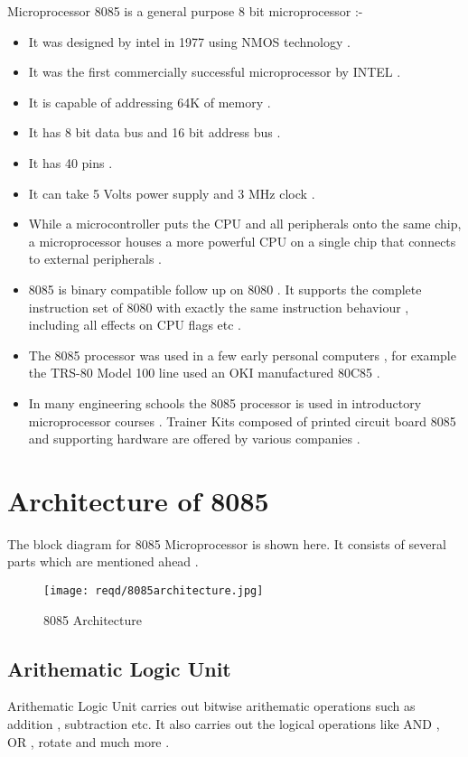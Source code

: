 \documentclass[14pt]{article}
\begin{document}
Microprocessor 8085 is a general purpose 8 bit microprocessor :-
\begin{itemize}
	\item{It was designed by intel in 1977 using NMOS technology .}
	\item{It was the first commercially successful microprocessor by INTEL .}
	\item{It is capable of addressing 64K of memory .}
	\item{It has 8 bit data bus and 16 bit address bus .}
	\item{It has 40 pins .}
	\item{It can take 5 Volts power supply and 3 MHz clock .}
	\item{While a microcontroller puts the CPU and all peripherals onto the same chip, a microprocessor houses a more powerful CPU on a single chip that connects to external peripherals .}
	\item{8085 is binary compatible follow up on 8080 . It supports the complete instruction set of 8080 with exactly the same instruction behaviour , including all effects on CPU flags etc .}
	\item{The 8085 processor was used in a few early personal computers , for example the TRS-80 Model 100 line used an OKI manufactured 80C85 .}
	\item{In many engineering schools the 8085 processor is used in introductory microprocessor courses . Trainer Kits composed of printed circuit board 8085 and supporting hardware are offered by various companies .}
\end{itemize}



\section{Architecture of 8085}
The block diagram for 8085 Microprocessor is shown here. It consists of several parts which are mentioned ahead .
\begin{figure}[h]
	\centering
	\texttt{[image: reqd/8085architecture.jpg]}
	\caption{8085 Architecture}
\end{figure}
\subsection{Arithematic Logic Unit}
Arithematic Logic Unit carries out bitwise arithematic operations such as addition , subtraction etc. It also carries out the logical operations like AND , OR , rotate and much more .
\end{document}
